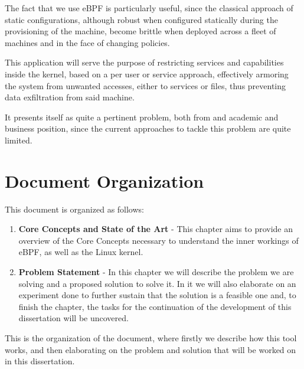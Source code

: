The fact that we use eBPF is particularly useful, since the classical approach of static configurations, although robust when configured statically during the provisioning of the machine, become brittle when deployed across a fleet of machines and in the face of changing policies. 

This application will serve the purpose of restricting services and capabilities inside the kernel, based on a per user or service approach, effectively armoring the system from unwanted accesses, either to services or files, thus preventing data exfiltration from said machine. 

It presents itself as quite a pertinent problem, both from and academic and business position, since the current approaches to tackle this problem are quite limited.

\section{Document Organization}

This document is organized as follows:
\begin{enumerate}
    \item \textbf{Core Concepts and State of the Art} - This chapter aims to provide an overview of the Core Concepts necessary to understand the inner workings of eBPF, as well as the Linux kernel.
    \item \textbf{Problem Statement} - In this chapter we will describe the problem we are solving and a proposed solution to solve it. In it we will also elaborate on an experiment done to further sustain that the solution is a feasible one and, to finish the chapter, the tasks for the continuation of the development of this dissertation will be uncovered.
\end{enumerate}

This is the organization of the document, where firstly we describe how this tool works, and then elaborating on the problem and solution that will be worked on in this dissertation.
